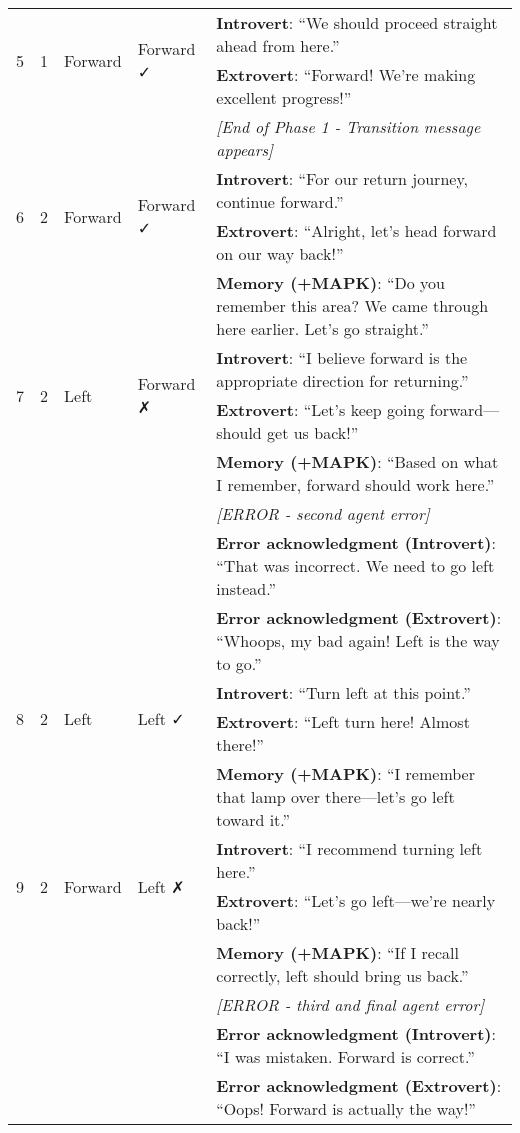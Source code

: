 \documentclass[12pt]{article}
\begin{document}
\begin{longtable}{p{}p{}p{}p{}p{}}
\multirow{2}{*}{5} & \multirow{2}{*}{1} & \multirow{2}{*}{Forward} & \multirow{2}{*}{Forward ✓} & \textbf{Introvert}: ``We should proceed straight ahead from here.'' \\
& & & & \textbf{Extrovert}: ``Forward! We're making excellent progress!'' \\
& & & & \textit{[End of Phase 1 - Transition message appears]} \\
\midrule

\multirow{2}{*}{6} & \multirow{2}{*}{2} & \multirow{2}{*}{Forward} & \multirow{2}{*}{Forward ✓} & \textbf{Introvert}: ``For our return journey, continue forward.'' \\
& & & & \textbf{Extrovert}: ``Alright, let's head forward on our way back!'' \\
& & & & \textbf{Memory (+MAPK)}: ``Do you remember this area? We came through here earlier. Let's go straight.'' \\
\midrule

\multirow{2}{*}{7} & \multirow{2}{*}{2} & \multirow{2}{*}{Left} & \multirow{2}{*}{Forward ✗} & \textbf{Introvert}: ``I believe forward is the appropriate direction for returning.'' \\
& & & & \textbf{Extrovert}: ``Let's keep going forward---should get us back!'' \\
& & & & \textbf{Memory (+MAPK)}: ``Based on what I remember, forward should work here.'' \\
& & & & \textit{[ERROR - second agent error]} \\
& & & & \textbf{Error acknowledgment (Introvert)}: ``That was incorrect. We need to go left instead.'' \\
& & & & \textbf{Error acknowledgment (Extrovert)}: ``Whoops, my bad again! Left is the way to go.'' \\
\midrule

\multirow{2}{*}{8} & \multirow{2}{*}{2} & \multirow{2}{*}{Left} & \multirow{2}{*}{Left ✓} & \textbf{Introvert}: ``Turn left at this point.'' \\
& & & & \textbf{Extrovert}: ``Left turn here! Almost there!'' \\
& & & & \textbf{Memory (+MAPK)}: ``I remember that lamp over there---let's go left toward it.'' \\
\midrule

\multirow{2}{*}{9} & \multirow{2}{*}{2} & \multirow{2}{*}{Forward} & \multirow{2}{*}{Left ✗} & \textbf{Introvert}: ``I recommend turning left here.'' \\
& & & & \textbf{Extrovert}: ``Let's go left---we're nearly back!'' \\
& & & & \textbf{Memory (+MAPK)}: ``If I recall correctly, left should bring us back.'' \\
& & & & \textit{[ERROR - third and final agent error]} \\
& & & & \textbf{Error acknowledgment (Introvert)}: ``I was mistaken. Forward is correct.'' \\
& & & & \textbf{Error acknowledgment (Extrovert)}: ``Oops! Forward is actually the way!'' \\
\midrule


\end{longtable}
\end{document}
